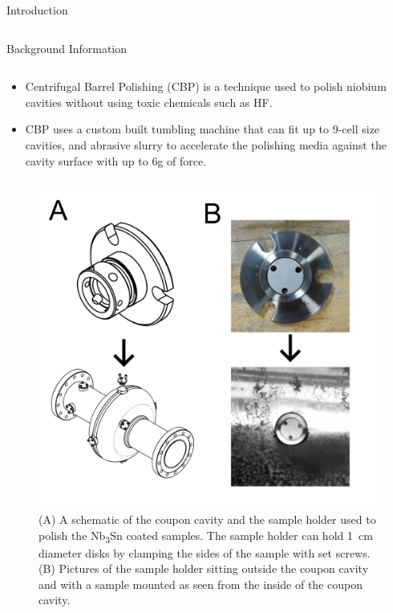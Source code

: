 \documentclass{beamer}
\begin{document}
\begin{frame}{}
\begin{columns}[t]
\begin{column}{0.32\linewidth}
\begin{block}{\label{sec:introduction}Introduction}
                \end{block}
                \begin{columns}[t]
                    \begin{block}{\label{sec:backgroundinformation}Background Information}
                        \begin{column}{0.45\columnwidth}
                            \begin{itemize}
                                \item Centrifugal Barrel Polishing (CBP) is a technique used to polish niobium cavities without using toxic chemicals such as HF.
                                \item CBP uses a custom built tumbling machine that can fit up to 9-cell size cavities, and abrasive slurry to accelerate the polishing media against the cavity surface with up to 6g of force.
                            \end{itemize}  
                        \end{column}
                        \begin{column}{0.45\columnwidth}
                            \begin{figure}[t]%
                                \centering%
                                \includegraphics[width=\columnwidth]{../doc/figs/Coupon_Cavity.png}%
                                \caption{(A) A schematic of the coupon cavity and the sample holder used to polish the Nb\textsubscript{3}Sn coated samples. The sample holder can hold 1~cm diameter disks by clamping the sides of the sample with set screws. (B) Pictures of the sample holder sitting outside the coupon cavity and with a sample mounted as seen from the inside of the coupon cavity.}%

\end{figure}
\end{column}
\end{block}
\end{columns}
\end{column}
\end{columns}
\end{frame}
\end{document}
